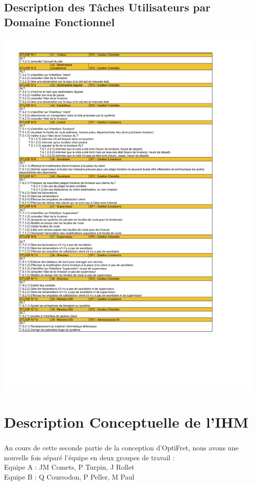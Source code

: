\documentclass{report}
\begin{document}
\section{Description des Tâches Utilisateurs par Domaine Fonctionnel}

\includegraphics[scale = 0.7]{images/DTUDF.pdf}




\chapter{Description Conceptuelle de l'IHM}

\paragraph{}
Au cours de cette seconde partie de la conception d'OptiFret, nous avons une nouvelle fois séparé l'équipe en deux groupes de travail :\\
Equipe A : JM Comets, P Turpin, J Rollet\\
Equipe B : Q Coursodon, P Peller, M Paul\\
\end{document}

